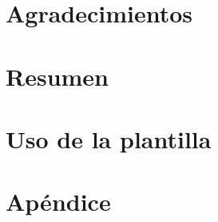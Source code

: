 \documentclass[a4paper, 11pt, showtrims]{memoir}
\title{\izenburua}
\author{\egilea}
\date{\data}
\begin{document}

% 


\cleardoublepage
\frontmatter


\chapter*{Agradecimientos}

\cleardoublepage


\chapter*{Resumen}

\cleardoublepage


\tableofcontents
\clearpage
\listoffigures
\clearpage
\listoftables
\clearpage
\listofalgorithms
{}


\cleardoublepage
\mainmatter
\pagestyle{ruled}

\chapter{Uso de la plantilla} \label{ch:plantilla}

\cleardoublepage


\backmatter
\appendix

\chapter{Apéndice} \label{ch:apendice}





\end{document}
